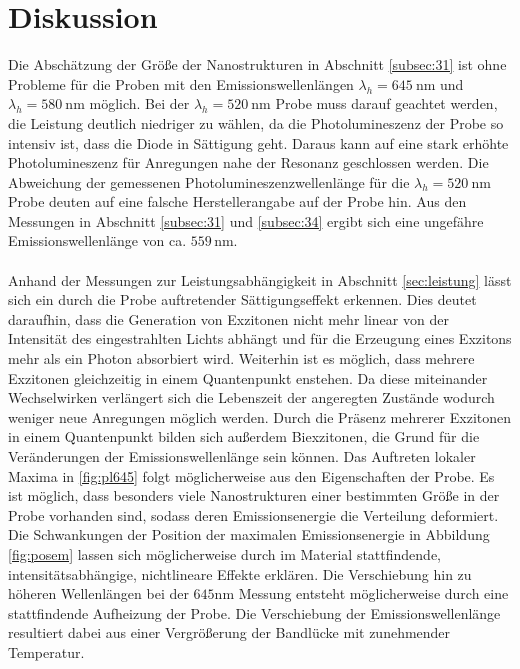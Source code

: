 \newpage
\section{Diskussion}
Die Abschätzung der Größe der Nanostrukturen in Abschnitt \ref{subsec:31} ist ohne Probleme
für die Proben mit den Emissionswellenlängen $\lambda_h = \SI{645}{\nano\meter}$
und $\lambda_h = \SI{580}{\nano\meter}$ möglich. Bei der $\lambda_h = \SI{520}{\nano\meter}$
Probe muss darauf geachtet werden, die Leistung deutlich niedriger zu wählen, da die Photolumineszenz der Probe
so intensiv ist, dass die Diode in Sättigung geht. Daraus kann auf eine stark erhöhte Photolumineszenz für
Anregungen nahe der Resonanz geschlossen werden. Die Abweichung der gemessenen Photolumineszenzwellenlänge für die $\lambda_h = \SI{520}{\nano\meter}$ Probe deuten auf eine falsche Herstellerangabe auf der Probe hin. Aus den Messungen in Abschnitt \ref{subsec:31} und \ref{subsec:34} ergibt sich eine ungefähre Emissionswellenlänge von ca. $559\,\si{\nano\meter}$.\\
\\
Anhand der Messungen zur Leistungsabhängigkeit in Abschnitt \ref{sec:leistung} lässt sich ein
durch die Probe auftretender Sättigungseffekt erkennen. Dies deutet daraufhin, dass die Generation von Exzitonen nicht mehr linear von der Intensität des eingestrahlten Lichts abhängt und für die Erzeugung eines Exzitons mehr als ein Photon absorbiert wird. Weiterhin ist es möglich, dass mehrere Exzitonen gleichzeitig in einem Quantenpunkt enstehen. Da diese miteinander Wechselwirken verlängert sich die Lebenszeit der angeregten Zustände wodurch weniger neue Anregungen möglich werden. Durch die Präsenz mehrerer Exzitonen in einem Quantenpunkt bilden sich außerdem Biexzitonen, die Grund für die Veränderungen der Emissionswellenlänge sein können. Das Auftreten lokaler Maxima in \ref{fig:pl645} folgt möglicherweise aus den Eigenschaften der Probe. Es ist möglich, dass besonders viele Nanostrukturen einer bestimmten Größe in der Probe vorhanden sind, sodass deren Emissionsenergie die Verteilung deformiert. \\
Die Schwankungen der Position der maximalen Emissionsenergie in Abbildung \ref{fig:posem}
lassen sich möglicherweise durch im Material stattfindende, intensitätsabhängige, nichtlineare
Effekte erklären. Die Verschiebung hin zu höheren Wellenlängen bei der $645\si{\nano\meter}$ Messung entsteht möglicherweise durch eine stattfindende Aufheizung der Probe. Die Verschiebung der Emissionswellenlänge resultiert dabei aus einer Vergrößerung der Bandlücke mit zunehmender Temperatur. \cite{thermik}
